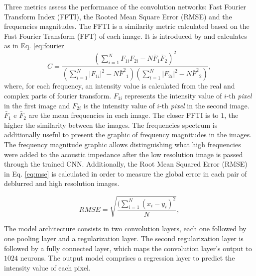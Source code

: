 \documentclass[conference,compsoc]{IEEEtran}
\begin{document}
Three metrics assess the performance of the convolution networks: Fast Fourier Transform Index (FFTI),
the Rooted Mean Square Error (RMSE) and the frequencies magnitudes.
The FFTI is a similarity metric calculated based on the Fast Fourier Transform (FFT) of each image.
It is introduced by \cite{naranyana} and calculates as in Eq. \ref{eq:fourier}
\begin{equation}
 C = \frac{ (\sum_{i=1}^{N}{F_{1i}F_{2i}} - N \bar{F}_1\bar{F}_2 )^2 }{ (\sum_{i=1}^{N}{|F_{1i}|^2} - N{\bar{F}^2}_1)( \sum_{i=1}^{N}{|F_{2i}|^2} - N{\bar{F}^2}_2 )},
 \label{eq:fourier}
\end{equation}
where, for each frequency, an intensity value is calculated from the real and complex parts of fourier
transform. $F_{1i}$ represents the intensity value of $i$-th \textit{pixel} in the first image and $F_{2i}$
is the intensity value of $i$-th \textit{pixel} in the second image. $\bar{F}_1$ e $\bar{F}_2$ are the mean
frequencies in each image. The closer FFTI is to $1$, the higher the similarity between the images.
The frequencies spectrum is additionally useful to present the graphic of frequency magnitudes in the images.
The frequency magnitude graphic allows distinguishing what high frequencies were added to the acoustic impedance
after the low resolution image is passed through the trained CNN. 
Additionally, the Root Mean Squared Error (RMSE) in Eq. \ref{eq:mse} is calculated in order to measure
the global error in each pair of deblurred and high resolution images.

\begin{equation}
 RMSE = \sqrt{\frac{ (\sum_{i=1}^{N}{(x_i -y_i)^2 } }{N}},
 \label{eq:mse}
\end{equation}

The model architecture consists in two convolution layers, each one followed by one
pooling layer and a regularization layer. The second regularization layer is followed
by a fully connected layer, which maps the convolution layer's output to $1024$ neurons.
The output model comprises a regression layer to predict the intensity value of each pixel.
\end{document}
